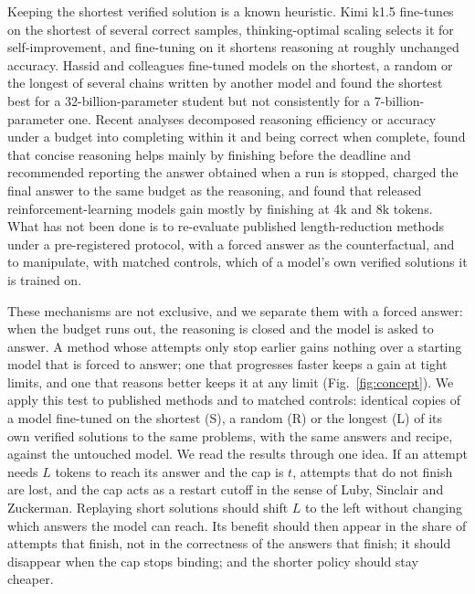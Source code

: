 \documentclass[10pt]{article}
\begin{document}
Keeping the shortest verified solution is a known heuristic. Kimi k1.5 fine-tunes on the shortest of several correct samples\cite{kimi2025k15}, thinking-optimal scaling selects it for self-improvement\cite{yang2025tops}, and fine-tuning on it shortens reasoning at roughly unchanged accuracy\cite{munkhbat2025concise,chen2024overthinking}. Hassid and colleagues fine-tuned models on the shortest, a random or the longest of several chains written by another model and found the shortest best for a 32-billion-parameter student but not consistently for a 7-billion-parameter one\cite{hassid2025overthink}. Recent analyses decomposed reasoning efficiency or accuracy under a budget into completing within it and being correct when complete\cite{kaiser2026decomposing,nie2026truncation}, found that concise reasoning helps mainly by finishing before the deadline and recommended reporting the answer obtained when a run is stopped\cite{carlon2026shorter}, charged the final answer to the same budget as the reasoning\cite{chang2026answer}, and found that released reinforcement-learning models gain mostly by finishing at 4k and 8k tokens\cite{yang2026outcome}. What has not been done is to re-evaluate published length-reduction methods under a pre-registered protocol, with a forced answer as the counterfactual, and to manipulate, with matched controls, which of a model's own verified solutions it is trained on.

These mechanisms are not exclusive, and we separate them with a forced answer: when the budget runs out, the reasoning is closed and the model is asked to answer\cite{qwen3report,muennighoff2025s1}. A method whose attempts only stop earlier gains nothing over a starting model that is forced to answer; one that progresses faster keeps a gain at tight limits, and one that reasons better keeps it at any limit (Fig.~\ref{fig:concept}). We apply this test to published methods and to matched controls: identical copies of a model fine-tuned on the shortest (S), a random (R) or the longest (L) of its own verified solutions to the same problems, with the same answers and recipe, against the untouched model. We read the results through one idea. If an attempt needs $L$ tokens to reach its answer and the cap is $t$, attempts that do not finish are lost, and the cap acts as a restart cutoff in the sense of Luby, Sinclair and Zuckerman\cite{luby1993optimal}. Replaying short solutions should shift $L$ to the left without changing which answers the model can reach. Its benefit should then appear in the share of attempts that finish, not in the correctness of the answers that finish; it should disappear when the cap stops binding; and the shorter policy should stay cheaper.
\end{document}
